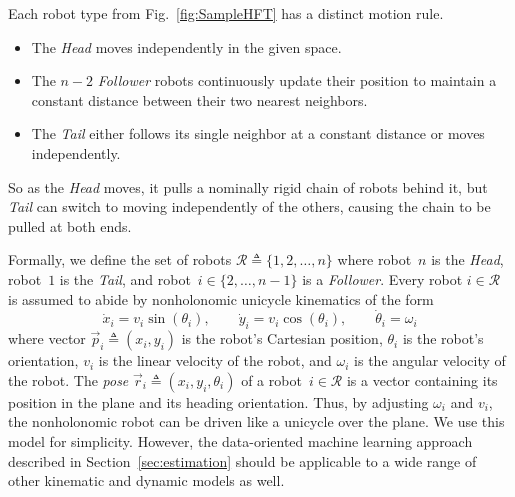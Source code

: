 \documentclass[letterpaper, 10 pt, conference]{ieeeconf}  %
\begin{document}
	Each robot type from Fig.~\ref{fig:SampleHFT} has a distinct motion
	rule.
	\begin{itemize}
		\item The \emph{Head} moves independently in the given space.
		\item The $n-2$ \emph{Follower} robots continuously update their
		position to maintain a constant distance between their two
		nearest neighbors.
		\item The \emph{Tail}
		either follows its single neighbor at a constant distance or
		moves independently.
	\end{itemize}
	So as the \emph{Head} moves, it pulls a nominally rigid chain of robots
	behind it, but \emph{Tail} can switch to moving independently of the
	others, causing the chain to be pulled at both ends.
	
	Formally, we define the set of robots $\mathcal{R} \triangleq \{1, 2,
	\ldots, n\}$ where robot~$n$ is the \emph{Head}, robot~$1$ is the
	\emph{Tail}, and robot~$i \in \{2, \ldots, n-1\}$ is a \emph{Follower}.
	Every robot $i \in \mathcal{R}$ is assumed to abide by nonholonomic
	unicycle kinematics of the form
	\begin{equation*}
		\dot{x}_i = v_i \sin(\theta_i),
		\qquad
		\dot{y}_i = v_i \cos(\theta_i),
		\qquad
		\dot{\theta}_i = \omega_i
	\end{equation*}
	where vector $\vec{p}_i \triangleq (x_i, y_i)$ is the robot's Cartesian
	position, $\theta_i$ is the robot's orientation, $v_i$ is the linear
	velocity of the robot, and $\omega_i$ is the angular velocity of the
	robot. The \emph{pose} $\vec{r}_i \triangleq (x_i, y_i, \theta_i)$ of a
	robot~$i \in \mathcal{R}$ is a vector containing its position in the
	plane and its heading orientation. Thus, by adjusting $\omega_i$ and
	$v_i$, the nonholonomic robot can be driven like a unicycle over the
	plane. We use this model for simplicity. However, the data-oriented
	machine learning approach described in Section~\ref{sec:estimation}
	should be applicable to a wide range of other kinematic and dynamic
	models as well.
	
\end{document}
